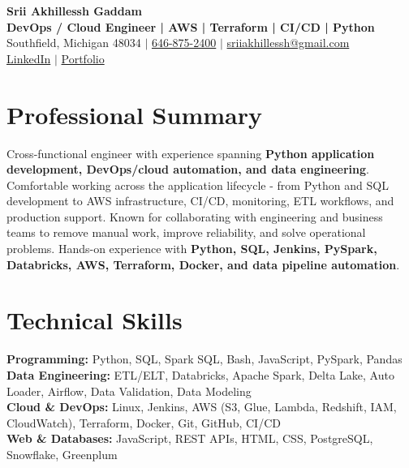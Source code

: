 \documentclass[letterpaper,10pt]{article}
\begin{document}
\fontsize{9.35pt}{10.45pt}\selectfont

\begin{center}
    {\LARGE \textbf{Srii Akhillessh Gaddam}} \\[-1pt]
    \textbf{DevOps / Cloud Engineer | AWS | Terraform | CI/CD | Python} \\[2pt]
    Southfield, Michigan 48034 $|$
    \href{tel:6468752400}{646-875-2400} $|$
    \href{mailto:sriiakhillessh@gmail.com}{sriiakhillessh@gmail.com} \\[1pt]
    \href{https://www.linkedin.com/in/srii-akhiilessh-gaddam-b48668191/}{LinkedIn} $|$
    \href{https://sriiakhillesshg.github.io/portfolio/}{Portfolio}
\end{center}
\vspace{-8pt}

\section{Professional Summary}
\small{Cross-functional engineer with experience spanning \textbf{Python application development, DevOps/cloud automation, and data engineering}. Comfortable working across the application lifecycle - from Python and SQL development to AWS infrastructure, CI/CD, monitoring, ETL workflows, and production support. Known for collaborating with engineering and business teams to remove manual work, improve reliability, and solve operational problems. Hands-on experience with \textbf{Python, SQL, Jenkins, PySpark, Databricks, AWS, Terraform, Docker, and data pipeline automation}.}

\section{Technical Skills}
\small{
\textbf{Programming:} Python, SQL, Spark SQL, Bash, JavaScript, PySpark, Pandas \\
\textbf{Data Engineering:} ETL/ELT, Databricks, Apache Spark, Delta Lake, Auto Loader, Airflow, Data Validation, Data Modeling \\
\textbf{Cloud \& DevOps:} Linux, Jenkins, AWS (S3, Glue, Lambda, Redshift, IAM, CloudWatch), Terraform, Docker, Git, GitHub, CI/CD \\
\textbf{Web \& Databases:} JavaScript, REST APIs, HTML, CSS, PostgreSQL, Snowflake, Greenplum
}
\end{document}
